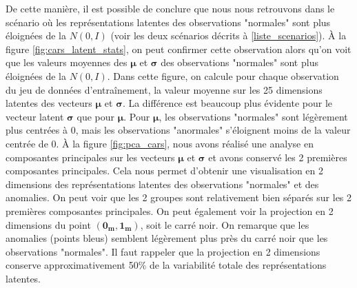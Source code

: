 De cette manière, il est possible de conclure que nous nous retrouvons dans le scénario où les représentations latentes des observations "normales" sont plus éloignées de la $N(0,I)$ (voir les deux scénarios décrits à \ref{liste_scenarios}). À la figure \ref{fig:cars_latent_stats}, on peut confirmer cette observation alors qu'on voit que les valeurs moyennes des $\boldsymbol{\mu}$ et $\boldsymbol{\sigma}$ des observations "normales" sont plus éloignées de la $N(0,I)$. Dans cette figure, on calcule pour chaque observation du jeu de données d'entraînement, la valeur moyenne sur les 25 dimensions latentes des vecteurs $\boldsymbol{\mu}$ et $\boldsymbol{\sigma}$. La différence est beaucoup plus évidente pour le vecteur latent $\boldsymbol{\sigma}$ que pour $\boldsymbol{\mu}$. Pour $\boldsymbol{\mu}$, les observations "normales" sont légèrement plus centrées à 0, mais les observations "anormales" s'éloignent moins de la valeur centrée de 0. À la figure \ref{fig:pca_cars}, nous avons réalisé une analyse en composantes principales sur les vecteurs $\boldsymbol{\mu}$ et $\boldsymbol{\sigma}$ et avons conservé les 2 premières composantes principales. Cela nous permet d'obtenir une visualisation en 2 dimensions des représentations latentes des observations "normales" et des anomalies. On peut voir que les 2 groupes sont relativement bien séparés sur les 2 premières composantes principales. On peut également voir la projection en 2 dimensions du point $(\boldsymbol{0_{m}}, \boldsymbol{1_{m}})$, soit le carré noir. On remarque que les anomalies (points bleus) semblent légèrement plus près du carré noir que les observations "normales". Il faut rappeler que la projection en 2 dimensions conserve approximativement 50\% de la variabilité totale des représentations latentes.

